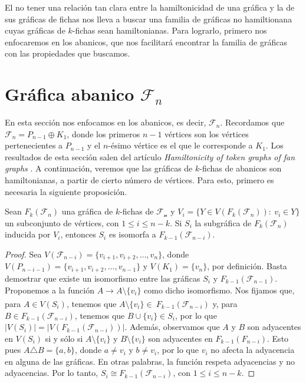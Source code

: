 El no tener una relaci\'on tan clara entre la hamiltonicidad de una gr\'afica y
la de sus gr\'aficas de fichas nos lleva a buscar una familia de gr\'aficas no
hamiltionana cuyas gr\'aficas de $k$-fichas sean hamiltonianas. Para lograrlo,
primero nos enfocaremos en los abanicos, que nos facilitar\'a encontrar la
familia de gr\'aficas con las propiedades que buscamos.

\section{Gr\'afica abanico \texorpdfstring{$\mathcal{F}_n$}{Fn}}%
\label{sec:SimpleFan}

En esta secci\'on nos enfocamos en los abanicos, es decir, $\mathcal{F}_n$.
Recordamos que $\mathcal{F}_n = P_{n-1} \oplus K_1$, donde los primeros $n-1$
v\'ertices son los v\'ertices pertenecientes a $P_{n-1}$ y el $n$-\'esimo
v\'ertice es el que le corresponde a $K_1$. Los resultados de esta secci\'on
salen del art\'iculo \textit{Hamiltonicity of token graphs of fan graphs}
\cite{riveraHamilt}. A continuaci\'on, veremos que las gr\'aficas de $k$-fichas
de abanicos son hamiltonianas, a partir de cierto n\'umero de
v\'ertices. Para esto, primero es necesaria la siguiente proposici\'on.

\begin{proposicion}
\label{prop:iso-SFan}
    Sean $F_k(\mathcal{F}_n)$ una gr\'afica de $k$-fichas de $\mathcal{F_n}$ y
    $V_i=\{ Y \in V(F_k(\mathcal{F}_n)) \colon\ v_i \in Y \}$ un subconjunto de
    v\'ertices, con $1 \leq i \leq n-k$. Si $S_i$ la subgr\'afica de
    $F_k(\mathcal{F}_n)$ inducida  por $V_i$, entonces $S_i$ es isomorfa a
    $F_{k-1}(\mathcal{F}_{n-i})$.
\end{proposicion}
    
\begin{proof}
    Sea $V(\mathcal{F}_{n-i}) = \{v_{i+1}, v_{i+2}, \dots, v_n\}$, donde
    $V(P_{n-i-1}) = \{v_{i+1}, v_{i+2}, \dots, v_{n-1}\}$ y $V(K_1)= \{v_n\}$,
    por definici\'on. Basta demostrar que existe un isomorfismo entre las
    gr\'aficas $S_i$ y $F_{k-1}(\mathcal{F}_{n-1})$. Proponemos a la funci\'on
    $A \xrightarrow[]{} A \setminus \{v_i\}$ como dicho isomorfismo. Nos fijamos
    que, para $A \in V(S_i)$, tenemos que $A \setminus \{v_i\} \in \
    F_{k-1}(\mathcal{F}_{n-i})$ y, para $B \in F_{k-1}(\mathcal{F}_{n-i})$,
    tenemos que $B \cup \{v_i\} \in S_i$, por lo que
    $|V(S_i)|=|V(F_{k-1}(\mathcal{F}_{n-i}))|$. Adem\'as, observamos que $A$ y
    $B $ son adyacentes en $V(S_i)$ si y s\'olo si $A \setminus \{v_i\}$ y $B
    \setminus \{v_i\}$ son adyacentes en $F_{k-1}(F_{n-i})$. Esto pues
    $A\triangle B = \{a,b\}$, donde $a\neq v_i$ y $b \neq v_i$, por lo que $v_i$
    no afecta la adyacencia en alguna de las gr\'aficas. En otras palabras, la
    funci\'on respeta adyacencias y no adyacencias. Por lo tanto, $S_i \cong
    F_{k-1}(\mathcal{F}_{n-i})$, con $1 \leq i \leq n-k$.
\end{proof}


